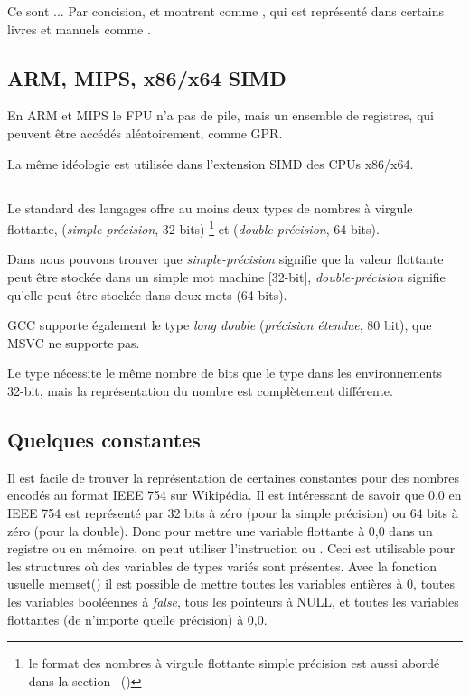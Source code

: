 Ce sont ... Par concision, \IDA et \olly montrent  comme ,
qui est représenté dans certains livres et manuels comme .

\subsection{ARM, MIPS, x86/x64 SIMD}

En ARM et MIPS le FPU n'a pas de pile, mais un ensemble de registres, qui peuvent
être accédés aléatoirement, comme \ac{GPR}.

La même idéologie est utilisée dans l'extension SIMD des CPUs x86/x64.

\subsection{\CCpp}


Le standard des langages \CCpp offre au moins deux types de nombres à virgule flottante,
\Tfloat (\emph{simple-précision}, 32 bits) \footnote{le format des nombres
à virgule flottante simple précision est aussi abordé dans la section \emph{\WorkingWithFloatAsWithStructSubSubSectionName}~()}
et \Tdouble (\emph{double-précision}, 64 bits).

Dans  nous pouvons trouver que \emph{simple-précision}
signifie que la valeur flottante peut être stockée dans un simple mot machine [32-bit],
\emph{double-précision} signifie qu'elle peut être stockée dans deux mots (64 bits).


GCC supporte également le type \emph{long double} (\emph{précision étendue},
80 bit), que MSVC ne supporte pas.

Le type \Tfloat nécessite le même nombre de bits que le type \Tint dans les environnements
32-bit, mais la représentation du nombre est complètement différente.





\subsection{Quelques constantes}

Il est facile de trouver la représentation de certaines constantes pour des nombres
encodés au format IEEE 754 sur Wikipédia.
Il est intéressant de savoir que 0,0 en IEEE 754 est représenté par 32 bits à zéro
(pour la simple précision) ou 64 bits à zéro (pour la double).
Donc pour mettre une variable flottante à 0,0 dans un registre ou en mémoire, on
peut utiliser l'instruction \MOV ou .
Ceci est utilisable pour les structures où des variables de types variés sont présentes.
Avec la fonction usuelle memset() il est possible de mettre toutes les variables
entières à 0, toutes les variables booléennes à \emph{false}, tous les pointeurs à
NULL, et toutes les variables flottantes (de n'importe quelle précision) à 0,0.


